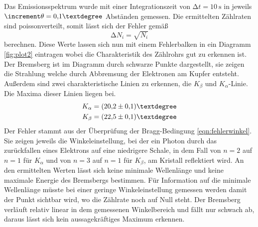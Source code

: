 Das Emissionsspektrum wurde mit einer Integrationszeit von $\increment t = \SI{10}{\second}$ in jeweils $\increment \theta = 0{,}1\textdegree$ Abständen gemessen.
Die ermittelten Zählraten sind poissonverteilt, somit lässt sich der Fehler gemäß
\begin{equation}
\increment N_{i} = \sqrt{N_{i}}
\end{equation}
berechnen. Diese Werte lassen sich nun mit einem Fehlerbalken in ein Diagramm \ref{fig:plot2} eintragen wobei die Charakteristik des Zählrohrs gut zu erkennen ist.
Der Bremsberg ist im Diagramm durch schwarze Punkte dargestellt, sie zeigen die Strahlung welche durch Abbremsung der Elektronen am Kupfer entsteht. 
Außerdem sind zwei charakteristische Linien zu erkennen, die $K_{\beta}$ und $K_{\alpha}$-Linie. 
Die Maxima dieser Linien liegen bei.
\begin{align}
K_{\alpha} &= (20{,}2 \pm 0{,}1)\textdegree \\
K_{\beta} &= (22{,}5 \pm 0{,}1)\textdegree
\end{align}
Der Fehler stammt aus der Überprüfung der Bragg-Bedingung \eqref{eqn:fehlerwinkel}.
Sie zeigen jeweils die Winkeleinstellung, bei der ein Photon durch das zurückfallen eines Elektrons auf eine
niedrigere Schale, in dem Fall von $n=2$ auf $n=1$ für $K_{\alpha}$ und von $n=3$ auf $n=1$ für $K_{\beta}$, am Kristall reflektiert wird. 
An den ermittelten Werten lässt sich keine minimale Wellenlänge und keine maximale Energie des Bremsbergs bestimmen. Für Information auf die minimale Wellenlänge müsste bei einer geringe Winkeleinstellung
gemessen werden damit der Punkt sichtbar wird, wo die Zählrate noch auf Null steht. Der Bremsberg verläuft relativ linear in dem gemessenen Winkelbereich und fällt nur schwach ab, daraus lässt sich kein
aussagekräftiges Maximum erkennen. 
